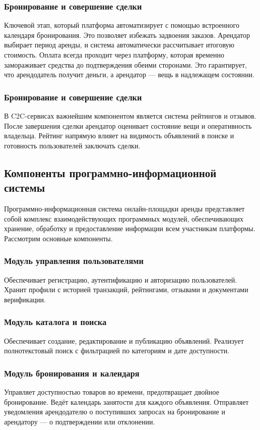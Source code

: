 \subsubsection{Бронирование и совершение сделки}
Ключевой этап, который платформа автоматизирует с помощью встроенного календаря бронирования. Это позволяет избежать задвоения заказов. Арендатор выбирает период аренды, и система автоматически рассчитывает итоговую стоимость. Оплата всегда проходит через платформу, которая временно замораживает средства до подтверждения обеими сторонами. Это гарантирует, что арендодатель получит деньги, а арендатор — вещь в надлежащем состоянии.
\subsubsection{Бронирование и совершение сделки}
В C2C-сервисах важнейшим компонентом является система рейтингов и отзывов. После завершения сделки арендатор оценивает состояние вещи и оперативность владельца. Рейтинг напрямую влияет на видимость объявлений в поиске и готовность пользователей заключать сделки.
\subsection{Компоненты программно-информационной системы}
Программно-информационная система онлайн-площадки аренды представляет собой комплекс взаимодействующих программных модулей, обеспечивающих хранение, обработку и предоставление информации всем участникам платформы. Рассмотрим основные компоненты.
\subsubsection{Модуль управления пользователями}
Обеспечивает регистрацию, аутентификацию и авторизацию пользователей. Хранит профили с историей транзакций, рейтингами, отзывами и документами верификации.
\subsubsection{Модуль каталога и поиска}
Обеспечивает создание, редактирование и публикацию объявлений. Реализует полнотекстовый поиск с фильтрацией по категориям и дате доступности.
\subsubsection{Модуль бронирования и календаря}
Управляет доступностью товаров во времени, предотвращает двойное бронирование. Ведёт календарь занятости для каждого объявления. Отправляет уведомления арендодателю о поступивших запросах на бронирование и арендатору — о подтверждении или отклонении.
